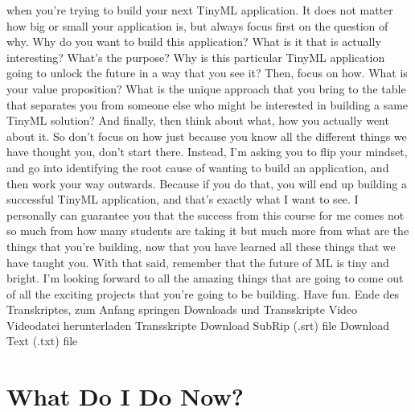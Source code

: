     when you're trying to build your next TinyML application.
    It does not matter how big or small your application is, but always focus first
    on the question of why.
    Why do you want to build this application?
    What is it that is actually interesting?
    What's the purpose?
    Why is this particular TinyML application
    going to unlock the future in a way that you see it?
    Then, focus on how.
    What is your value proposition?
    What is the unique approach that you bring to the table that separates you
    from someone else who might be interested in building a same TinyML
    solution?
    And finally, then think about what, how you actually went about it.
    So don't focus on how just because you know all the different things
    we have thought you, don't start there.
    Instead, I'm asking you to flip your mindset,
    and go into identifying the root cause of wanting to build an application,
    and then work your way outwards.
    Because if you do that, you will end up building a successful TinyML
    application, and that's exactly what I want to see.
    I personally can guarantee you that the success from this course for me
    comes not so much from how many students are taking it but much more
    from what are the things that you're building, now that you have learned all
    these things that we have taught you.
    With that said, remember that the future of ML is tiny and bright.
    I'm looking forward to all the amazing things
    that are going to come out of all the exciting projects
    that you're going to be building.
    Have fun.
    Ende des Transkriptes, zum Anfang springen
    Downloads und Transskripte
    Video
    Videodatei herunterladen
    Transskripte
    Download SubRip (.srt) file
    Download Text (.txt) file    
    
    
\section{What Do I Do Now?}

